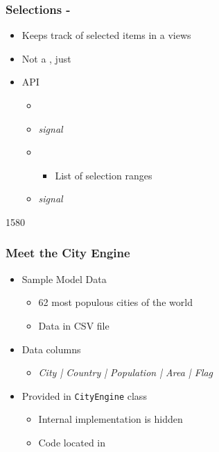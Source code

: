 \begin{slide}{}\frametitle{Selections - }
\begin{itemize}
  \item Keeps track of selected items in a views
  \item Not a , just 
  \item {} API
  \begin{itemize}
    \item {}
    \item \textit{signal} 
    \item {} 
      \begin{itemize}
        \item List of selection ranges
      \end{itemize}
      \item \textit{signal} 
  \end{itemize}
\end{itemize}
\end{slide}


\begin{slide}{1580}\frametitle{Meet the City Engine}
  \begin{itemize}
  \item Sample Model Data
    \begin{itemize}
    \item 62 most populous cities of the world
    \item Data in CSV file
   \end{itemize}
 \item Data columns
    \begin{itemize}
    \item \textit{City | Country | Population | Area | Flag}
   \end{itemize}
 \medskip
 \item Provided in \texttt{CityEngine} class
   \begin{itemize}
   \item Internal implementation is hidden
   \item Code located in \href{run:modelview/cityengine}{}
   \end{itemize}
 \end{itemize}
\end{slide}

